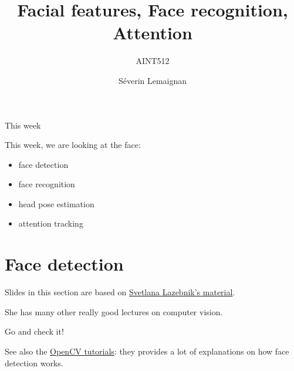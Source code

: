 \documentclass[compress]{beamer}
\title{Facial features, Face recognition, Attention}
\subtitle{AINT512}
\date{}
\author{Séverin Lemaignan}
\institute{Centre for Neural Systems and Robotics\\{\bf Plymouth University}}
\makeatletter
\let\beamer@writeslidentry@miniframeson=\beamer@writeslidentry
\def\beamer@writeslidentry@miniframesoff{%
  \expandafter\beamer@ifempty\expandafter{\beamer@framestartpage}{}%
  {%
    \clearpage\beamer@notesactions%
  }
}
\newcommand*{\miniframeson}{\let\beamer@writeslidentry=\beamer@writeslidentry@miniframeson}
\newcommand*{\miniframesoff}{\let\beamer@writeslidentry=\beamer@writeslidentry@miniframesoff}
\makeatother
\begin{document}
\miniframesoff


\maketitle


\begin{frame}{This week}

This week, we are looking at the face:

    \begin{itemize}
        \item face detection
        \item face recognition
        \item head pose estimation
        \item attention tracking
    \end{itemize}

\end{frame}

\miniframeson

\section{Face detection}


\begin{frame}[plain]

    Slides in this section are based on
    \href{http://slazebni.cs.illinois.edu/spring16/}{Svetlana Lazebnik's
    material}.
    
    She has many other really good lectures on computer vision.
    
    Go and check it!

    \vspace{2em}
    See also the
    \href{https://docs.opencv.org/3.3.0/d7/d8b/tutorial_py_face_detection.html}{OpenCV
    tutorials}: they provides a lot of explanations on how face detection works.
\end{frame}

\end{document}
